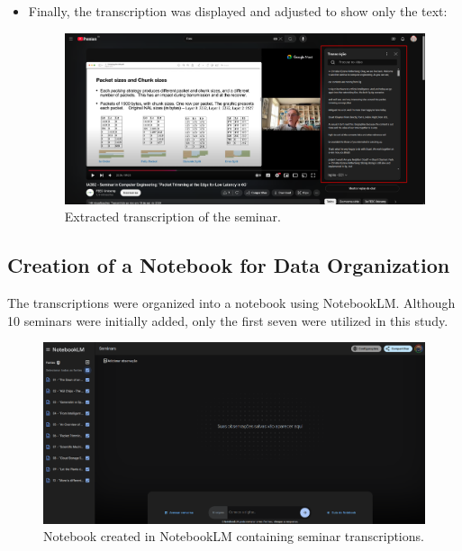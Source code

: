 \begin{itemize}
\begin{figure}[H]
    \end{figure}
    \item Finally, the transcription was displayed and adjusted to show only the text:
    \begin{figure}[H]
        \centering
        \includegraphics[scale=0.35]{Imagens/the trans.png}
        \caption{Extracted transcription of the seminar.}
    \end{figure}
\end{itemize}

\subsection{Creation of a Notebook for Data Organization}
The transcriptions were organized into a notebook using NotebookLM. Although 10 seminars were initially added, only the first seven were utilized in this study. 
\begin{figure}[H]
    \centering
    \includegraphics[scale=0.35]{Imagens/completed Notebook.png}
    \caption{Notebook created in NotebookLM containing seminar transcriptions.}
\end{figure}


